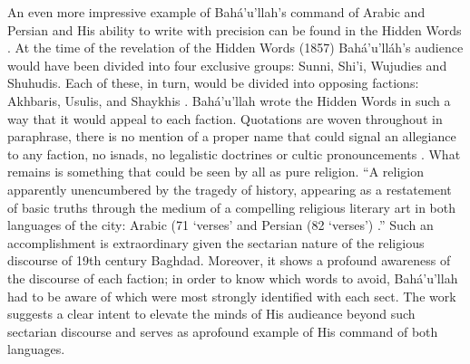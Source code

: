 \documentclass[12pt, oneside]{report}
\begin{document}
\par
An even more impressive example of Bah\'{a}'u'llah's command of Arabic and Persian and His ability to write with precision can be found in the Hidden Words \cite{bahaullah_hidden_2002}. At the time of the revelation of the Hidden Words (1857) Bahá'u'lláh's audience would have been divided into four exclusive groups: Sunni, Shi'i, Wujudies and Shuhudis. Each of these, in turn, would be divided into opposing factions: Akhbaris, Usulis, and Shaykhis \cite{lawson_todd_globalization_2005}.  Bah\'{a}'u'llah wrote the Hidden Words in such a way that it would appeal to each faction. Quotations are woven throughout in paraphrase, there is no mention of a proper name that could signal an allegiance to any faction, no isnads, no legalistic doctrines or cultic pronouncements \cite{lawson_todd_globalization_2005}. What remains is something that could be seen by all as pure religion. ``A religion apparently unencumbered by the tragedy of history, appearing as a restatement of basic truths through the medium of a compelling religious literary art in both languages of the city: Arabic (71 `verses' and Persian (82 `verses') \cite{lawson_todd_globalization_2005}.'' Such an accomplishment is extraordinary given the sectarian nature of the religious discourse of 19th century Baghdad. Moreover, it shows a profound awareness of the discourse of each faction; in order to know which words to avoid, Bah\'{a}'u'llah had to be aware of which were most strongly identified with each sect. The work suggests a clear intent to elevate the minds of His audieance beyond such sectarian discourse and serves as aprofound example of His command of both languages.
\end{document}
